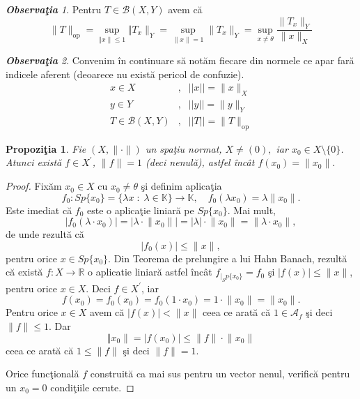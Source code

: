 \documentclass[ a4paper, 12pt]{report}
\newtheorem{prop}[theorem]{\bf Propozi\c tia }
\theoremstyle{definition}
\theoremstyle{remark}
\newtheorem{obs}{\bf Observa\c tia }[section]
\numberwithin{equation}{section}
\begin{document}
\begin{obs} Pentru $T \in \mathcal{B}(X,Y)$ avem c\u a
\[ \lVert  T \rVert_{\mbox{op}} = \sup\limits_{\Vert x \rVert \leq 1} \Vert T_x \rVert_{Y} = \sup\limits_{\lVert x \rVert = 1} \lVert T_x \rVert_{Y} = \sup\limits_{x \neq \theta} \frac{\lVert T_x \rVert_{Y}}{\lVert x \rVert_{X}} \]
\end{obs}

\begin{obs}
Convenim \^in continuare s\u a not\u am fiecare din normele ce apar far\u a indicele aferent (deoarece nu exist\u a pericol de confuzie).
\begin{eqnarray*}
x \in X&,& ||x|| =\lVert x \rVert_{X}\\
y \in Y&,& ||y|| = \lVert y \rVert_{Y}\\
T \in \mathcal{B}(X,Y)&,& ||T|| = \lVert T \rVert_{\mbox{op}}
\end{eqnarray*}
\end{obs}

\begin{prop}\label{p125}
Fie $(X, \lVert \cdot \rVert)$ un spa\c tiu normat, $X \neq (0),$ iar $x_0 \in X\setminus \{ 0 \}$. Atunci exist\u a $f \in X^{'}$, $\lVert f \rVert = 1$ (deci nenul\u a), astfel \^inc\^at $f(x_0) = \lVert x_0 \rVert.$
\end{prop}

\begin{proof}
Fix\u am $x_0 \in X$ cu $x_0 \neq \theta$ \c si definim aplica\c tia
$$f_0 : Sp\{ x_0\} = \{ \lambda  x \; : \; \lambda \in \mathbb{K} \} \rightarrow \mathbb{K},\quad  f_0(\lambda  x_0) = \lambda  \lVert x_0 \rVert. $$
Este imediat c\u a $f_0$ este o aplica\c tie liniar\u a pe $Sp\{ x_0 \}$. Mai mult,
$$\lvert f_0(\lambda \cdot x_0) \rvert = \lvert \lambda \cdot \lVert x_0 \rVert \rvert = \lvert \lambda \rvert \cdot \lVert x_0  \rVert = \lVert \lambda \cdot x_0 \rVert,$$ de unde rezult\u a c\u a $$\lvert f_0(x) \rvert \leq \lVert x \rVert,$$ pentru orice $x \in Sp\{x_0\}$. Din Teorema de prelungire a lui Hahn Banach, rezult\u a c\u a  exist\u a  $f : X \rightarrow \mathbb{R}$ o aplicatie liniar\u a astfel \^inc\^at $f_{|_Sp\{x_0\}} = f_0$ \c si $\lvert f(x) \rvert \leq \lVert x \rVert$, pentru orice $x \in X$. Deci $f \in X^{'}$, iar
$$f(x_0) = f_0(x_0) = f_0(1 \cdot x_0) = 1 \cdot \lVert x_0 \rVert = \lVert x_0 \rVert.$$
Pentru orice $x \in X$ avem c\u a $\lvert f(x) \rvert < \lVert x \rVert$ ceea ce arat\u a c\u a $1 \in \mathcal{A}_{f}$ \c si deci $\lVert f \rVert \leq 1$. Dar
$$\Vert x_0 \rVert = \lvert f(x_0) \rvert \leq \lVert f \rVert \cdot \lVert x_0 \rVert$$ ceea ce arat\u a c\u a $1 \leq \lVert f \rVert$ \c si deci $\lVert f \rVert = 1.$

Orice func\c tional\u a $f$ construit\u a ca mai sus pentru un vector nenul, verific\u a pentru un $x_0 = 0$ condi\c tiile cerute.
\end{proof}
\end{document}
